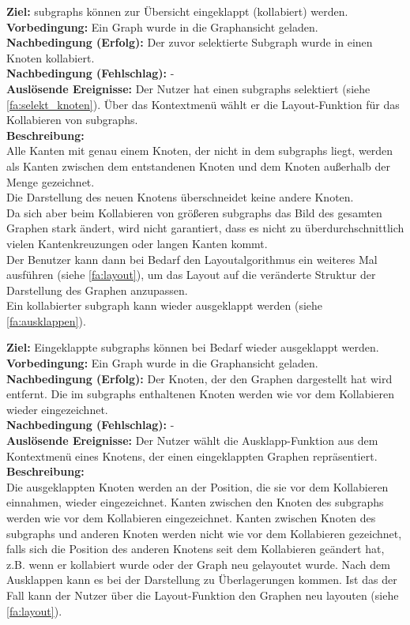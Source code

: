 \label{fa:kollabieren}
\textbf{Ziel:} \glspl{subgraph} können zur Übersicht eingeklappt (kollabiert) werden.\\
\textbf{Vorbedingung:} Ein Graph wurde in die Graphansicht geladen.\\
\textbf{Nachbedingung (Erfolg):} Der zuvor selektierte Subgraph wurde in einen Knoten kollabiert.\\
\textbf{Nachbedingung (Fehlschlag):} -\\
\textbf{Auslösende Ereignisse:} Der Nutzer hat einen \glspl{subgraph} selektiert (siehe \ref{fa:selekt_knoten}).
Über das Kontextmenü wählt er die Layout-Funktion für das Kollabieren von \glspl{subgraph}.\\
\textbf{Beschreibung:}\\
Alle Kanten mit genau einem Knoten, der nicht in dem \glspl{subgraph} liegt, werden als Kanten zwischen dem entstandenen Knoten und dem Knoten außerhalb der Menge gezeichnet.\\
Die Darstellung des neuen Knotens überschneidet keine andere Knoten.\\
Da sich aber beim Kollabieren von größeren \glspl{subgraph} das Bild des gesamten Graphen stark ändert, wird nicht garantiert,
dass es nicht zu überdurchschnittlich vielen Kantenkreuzungen oder langen Kanten kommt.\\
Der Benutzer kann dann bei Bedarf den Layoutalgorithmus ein weiteres Mal ausführen (siehe \ref{fa:layout}), um das Layout auf die
veränderte Struktur der Darstellung des Graphen anzupassen.\\
Ein kollabierter \gls{subgraph} kann wieder ausgeklappt werden (siehe \ref{fa:ausklappen}).


\label{fa:ausklappen}
\textbf{Ziel:} Eingeklappte \glspl{subgraph} können bei Bedarf wieder ausgeklappt werden.\\
\textbf{Vorbedingung:} Ein Graph wurde in die Graphansicht geladen.\\
\textbf{Nachbedingung (Erfolg):} Der Knoten, der den Graphen dargestellt hat wird entfernt. Die im \glspl{subgraph} enthaltenen Knoten werden wie vor dem Kollabieren wieder eingezeichnet.\\
\textbf{Nachbedingung (Fehlschlag):} -\\
\textbf{Auslösende Ereignisse:} Der Nutzer wählt die Ausklapp-Funktion aus dem Kontextmenü eines Knotens, der einen eingeklappten Graphen repräsentiert.\\
\textbf{Beschreibung:}\\
Die ausgeklappten Knoten werden an der Position, die sie vor dem Kollabieren einnahmen,  wieder eingezeichnet.
Kanten zwischen den Knoten des \glspl{subgraph} werden wie vor dem Kollabieren eingezeichnet.
Kanten zwischen Knoten des \glspl{subgraph} und anderen Knoten werden nicht wie vor dem Kollabieren gezeichnet,
falls sich die Position des anderen Knotens seit dem Kollabieren geändert hat, z.B. wenn er kollabiert wurde oder der Graph neu gelayoutet wurde.
Nach dem Ausklappen kann es bei der Darstellung zu Überlagerungen kommen.
Ist das der Fall kann der Nutzer über die Layout-Funktion den Graphen neu layouten (siehe \ref{fa:layout}).

